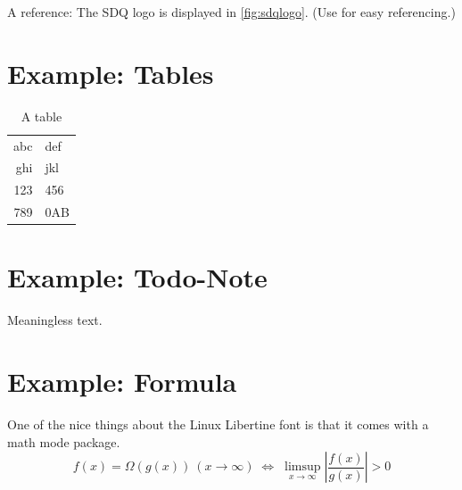 A reference: The SDQ logo is displayed in \autoref{fig:sdqlogo}. 
(Use  for easy referencing.) 

\section{Example: Tables}
\label{sec:Introduction:Tables}
\begin{table}[h]
\centering
\begin{tabular}{r l}
\toprule
abc & def\\
ghi & jkl\\
\midrule
123 & 456\\
789 & 0AB\\
\bottomrule
\end{tabular}
\caption{A table}
\label{tab:atable}
\end{table}

\section{Example: Todo-Note}
Meaningless text.

\section{Example: Formula}
One of the nice things about the Linux Libertine font is that it comes with
a math mode package.
\begin{displaymath}
f(x)=\Omega(g(x))\ (x\rightarrow\infty)\;\Leftrightarrow\;
\limsup_{x \to \infty} \left|\frac{f(x)}{g(x)}\right|> 0
\end{displaymath}

